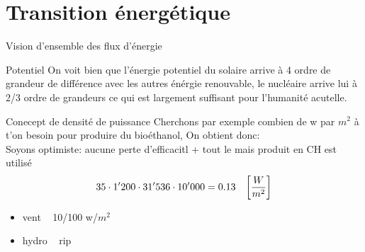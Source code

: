 \section{Transition énergétique}
    
\begin{parag}{Vision d'ensemble des flux d'énergie}
	\begin{subparag}{Potentiel}
	    On voit bien que l'énergie potentiel du solaire arrive à 4 ordre de grandeur de différence avec les autres énérgie renouvable, le nucléaire arrive lui à 2/3 ordre de grandeurs ce qui est largement suffisant pour l'humanité acutelle.
	\end{subparag}
    
\end{parag}

\begin{parag}{Conecept de densité de puissance}
    Cherchons par exemple combien de w par $m^2$  à t'on besoin pour produire du bioéthanol, On obtient donc:\\
    Soyons optimiste: aucune perte d'efficacitl + tout le mais produit en CH est utilisé
    \begin{align*} 35 \cdot 1'200 \cdot 31'536 \cdot  10'000 = 0.13 \mathspace \left[\frac{W}{m^2}\right] \end{align*}
\begin{itemize}
	\item vent ~ 10/100 w/$m^2$
		\item hydro ~ rip
\end{itemize}

\end{parag}

